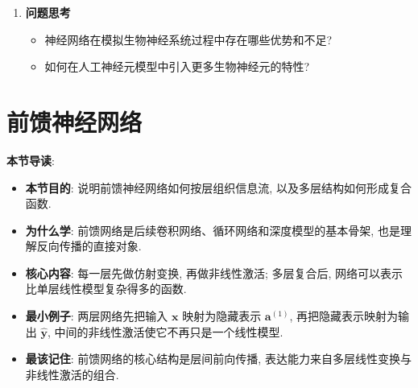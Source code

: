 \documentclass{../nndlcourse}
\begin{document}
\begin{enumerate}
\begin{itemize}
        \item 与之相对, 符号主义模型强调基于显式符号和规则的推理, 更适合知识表示与逻辑决策任务; 连接主义更擅长处理复杂、非结构化数据, 但通常面临可解释性较弱的问题. 
    \end{itemize}
    \item \textbf{问题思考}
    \begin{itemize}
        \item 神经网络在模拟生物神经系统过程中存在哪些优势和不足?
        \item 如何在人工神经元模型中引入更多生物神经元的特性?
    \end{itemize}
\end{enumerate}
\section{前馈神经网络}

\textbf{本节导读}:
\begin{itemize}
    \item \textbf{本节目的}: 说明前馈神经网络如何按层组织信息流, 以及多层结构如何形成复合函数.
    \item \textbf{为什么学}: 前馈网络是后续卷积网络、循环网络和深度模型的基本骨架, 也是理解反向传播的直接对象.
    \item \textbf{核心内容}: 每一层先做仿射变换, 再做非线性激活; 多层复合后, 网络可以表示比单层线性模型复杂得多的函数.
    \item \textbf{最小例子}: 两层网络先把输入 $\boldsymbol{x}$ 映射为隐藏表示 $\boldsymbol{a}^{(1)}$, 再把隐藏表示映射为输出 $\hat{\boldsymbol{y}}$, 中间的非线性激活使它不再只是一个线性模型.
    \item \textbf{最该记住}: 前馈网络的核心结构是层间前向传播, 表达能力来自多层线性变换与非线性激活的组合.
\end{itemize}
\end{document}
